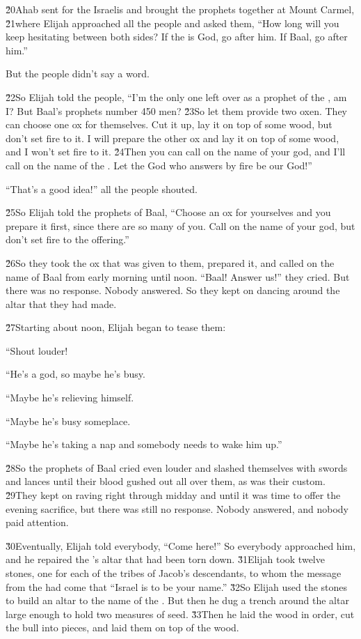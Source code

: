\v{20}Ahab sent for the Israelis and brought the prophets together at Mount Carmel, \v{21}where Elijah approached all the people and asked them, ``How long will you keep hesitating between both sides? If the  is God, go after him. If Baal, go after him.''

But the people didn't say a word.

\v{22}So Elijah told the people, ``I'm the only one left over as a prophet of the , am I? But Baal's prophets number 450 men? \v{23}So let them provide two oxen. They can choose one ox for themselves. Cut it up, lay it on top of some wood, but don't set fire to it. I will prepare the other ox and lay it on top of some wood, and I won't set fire to it. \v{24}Then you can call on the name of your god, and I'll call on the name of the . Let the God who answers by fire be our God!''

``That's a good idea!'' all the people shouted.

\v{25}So Elijah told the prophets of Baal, ``Choose an ox for yourselves and you prepare it first, since there are so many of you. Call on the name of your god, but don't set fire to the offering.''

\v{26}So they took the ox that was given to them, prepared it, and called on the name of Baal from early morning until noon. ``Baal! Answer us!'' they cried. But there was no response. Nobody answered. So they kept on dancing around the altar that they had made.

\v{27}Starting about noon, Elijah began to tease them:

``Shout louder!

``He's a god, so maybe he's busy.

``Maybe he's relieving himself.

``Maybe he's busy someplace.

``Maybe he's taking a nap and somebody needs to wake him up.''

\v{28}So the prophets of Baal cried even louder and slashed themselves with swords and lances until their blood gushed out all over them, as was their custom. \v{29}They kept on raving right through midday and until it was time to offer the evening sacrifice, but there was still no response. Nobody answered, and nobody paid attention.

\v{30}Eventually, Elijah told everybody, ``Come here!'' So everybody approached him, and he repaired the 's altar that had been torn down. \v{31}Elijah took twelve stones, one for each of the tribes of Jacob's descendants, to whom the message from the  had come that ``Israel is to be your name.'' \v{32}So Elijah used the stones to build an altar to the name of the . But then he dug a trench around the altar large enough to hold two measures of seed. \v{33}Then he laid the wood in order, cut the bull into pieces, and laid them on top of the wood.

